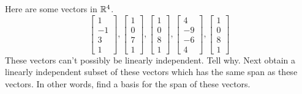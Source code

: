 \documentclass{ximera}
\begin{document}
\begin{problem}\label{prb:3.33} Here are some vectors in $\mathbb{R}^{4}$.
\begin{equation*}
\left[
\begin{array}{r}
1 \\
-1 \\
3 \\
1
\end{array}
\right] ,\left[
\begin{array}{r}
1 \\
0 \\
7 \\
1
\end{array}
\right] ,\left[
\begin{array}{r}
1 \\
0 \\
8 \\
1
\end{array}
\right] ,\left[
\begin{array}{r}
4 \\
-9 \\
-6 \\
4
\end{array}
\right] ,\left[
\begin{array}{r}
1 \\
0 \\
8 \\
1
\end{array}
\right]
\end{equation*}
These vectors can't possibly be linearly independent. Tell why. Next obtain a
linearly independent subset of these vectors which has the same span as
these vectors. In other words, find a basis for the span of these vectors.
\end{problem}
\end{document}
